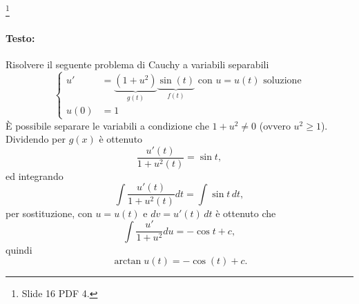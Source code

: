 \begin{example}\footnote{Slide 16 PDF 4.}
    \paragraph{Testo:} Risolvere il seguente problema di Cauchy a variabili separabili
    \begin{equation*}
        \begin{cases}
            u' &= \underbrace{(1+u^2)}_{g(t)}\underbrace{\sin(t)}_{f(t)} \text{ con } u=u(t) \text{ soluzione}\\
            u(0) &= 1
        \end{cases}
    \end{equation*}
    È possibile separare le variabili a condizione che $1+u^2\neq 0$ (ovvero $u^2\geq1$). Dividendo per $g(x)$ è ottenuto
    \begin{equation*}
        \frac{u'(t)}{1+u^2(t)} = \sin t,
    \end{equation*}
    ed integrando
    \begin{equation*}
        \int \frac{u'(t)}{1+u^2(t)}dt = \int\sin t \,dt,
    \end{equation*}
    per sostituzione, con $u=u(t)$ e $dv=u'(t)\,dt$ è ottenuto che
    \begin{equation*}
        \int \frac{u'}{1+u^2}du = -\cos t + c,
    \end{equation*}
    quindi
    \begin{equation}\label{eq:arctan_esercizio_cauchy}
        \arctan u(t) = -\cos(t) + c.
    \end{equation}

\end{example}
